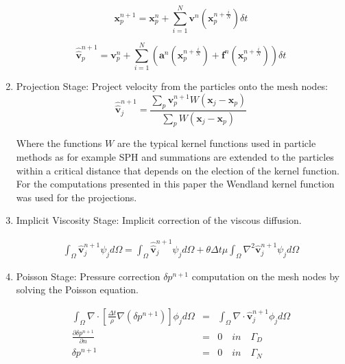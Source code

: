 \begin{enumerate}
\begin{equation}\label{Step2astep}
\mathbf{x}^{n+1}_{p}=\mathbf{x}^{n}_{p} + \sum_{i=1}^{N} \mathbf{v}^{n}(\mathbf{x}^{n+\frac{i}{N}}_{p}) \delta t
\end{equation}

\begin{equation}\label{Step2bstep}
\widehat{\widehat{\mathbf{v}}}^{n+1}_{p}=\mathbf{v}^{n}_{p} + \sum_{i=1}^{N} \left(\mathbf{a}^{n}(\mathbf{x}^{n+\frac{i}{N}}_{p}) + \mathbf{f}^{n} (\mathbf{x}^{n+\frac{i}{N}}_{p})\right)  \delta t
\end{equation}

  \item Projection Stage: Project velocity from the particles onto the mesh nodes:
  \begin{equation}\label{Step3a}
\displaystyle \widehat{\widehat{\mathbf{v}}}^{n+1}_{j}=\frac{\sum_{p} \mathbf{v}^{n+1}_{p} W(\mathbf{x}_{j}-\mathbf{x}_{p})}{\sum_{p} W(\mathbf{x}_{j}-\mathbf{x}_{p})}
\end{equation}



Where the functions $W$ are the typical kernel functions used in particle methods as for example SPH \cite{Mon77} and summations are extended to the particles within a critical distance that depends on the election of the kernel function. For the computations presented in this paper the Wendland kernel function \cite{Wendland} was used for the projections.

  \item Implicit Viscosity Stage: Implicit correction of the viscous diffusion.

 \begin{eqnarray}\label{Step4a}
\displaystyle \int_{\Omega} \widehat{\mathbf{v}}^{n+1}_{j}\psi_j d\Omega =\int_{\Omega} \widehat{\widehat{\mathbf{v}}}^{n+1}_{j}\psi_j d\Omega + \theta \Delta t \mu \int_{\Omega} \nabla^{2}\widehat{\mathbf{v}}^{n+1}_{j} \psi_j d\Omega
\end{eqnarray}



 \item Poisson Stage: Pressure correction $\delta p^{n+1}$ computation on the mesh nodes by solving the Poisson equation.


 \begin{eqnarray}\label{Step5a}
   \int_{\Omega} \nabla \cdot [\frac{\Delta t}{\rho}\nabla(\delta p^{n+1})] \phi_j d\Omega &=& \int_{\Omega} \nabla \cdot \widehat{\mathbf{v}}_j^{n+1} \phi_j d\Omega \\
   \frac{\partial \delta p^{n+1}}{\partial n} &=& 0 \quad in \quad \Gamma_D \\
   \delta p^{n+1} &=& 0 \quad in \quad \Gamma_N 
 \end{eqnarray}
 

\end{enumerate}
